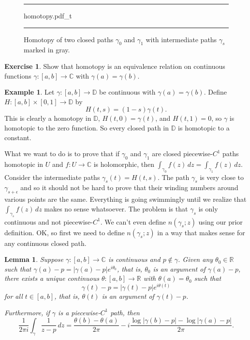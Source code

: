 \documentclass[12pt,openany]{book}
\newcommand{\sabs}[1]{\lvert {#1} \rvert}
\newcommand{\C}{{\mathbb{C}}}
\newcommand{\R}{{\mathbb{R}}}
\newcommand{\D}{{\mathbb{D}}}
\theoremstyle{plain}
\newtheorem{lemma}[thm]{Lemma}
\theoremstyle{remark}
\theoremstyle{definition}
\newenvironment{exbox}{%
    \def\FrameCommand{\vrule width 1pt \relax\hspace{10pt}}%
    \MakeFramed{\advance\hsize-\width\FrameRestore}%
}{%
    \endMakeFramed
}
\newenvironment{myfig}{%
\begin{figure}[h!t]
\noindent\rule{\textwidth}{0.5pt}\vspace{12pt}\par\centering}%
{\par\noindent\rule{\textwidth}{0.5pt}
\end{figure}}
\theoremstyle{exercise}
\newtheorem{exercise}{Exercise}[section]
\theoremstyle{example}
\newtheorem{example}[thm]{Example}
\begin{document}
\begin{myfig}
{homotopy.pdf_t}
\caption{Homotopy of two closed paths $\gamma_0$ and
$\gamma_1$ with intermediate paths $\gamma_s$ marked in gray.\label{fig:homotopy}}
\end{myfig}

\begin{exbox}
\begin{exercise}
Show that homotopy is an equivalence relation on continuous functions
$\gamma \colon [a,b] \to \C$ with $\gamma(a)=\gamma(b)$.
\end{exercise}
\end{exbox}

\begin{example} \label{example:homotopydiscsc}
Let $\gamma \colon [a,b] \to \D$ be continuous with $\gamma(a)=\gamma(b)$.  Define
$H \colon [a,b] \times [0,1] \to \D$ by
\begin{equation*}
H(t,s) = (1-s) \gamma(t) .
\end{equation*}
This is clearly a homotopy in $\D$, $H(t,0) = \gamma(t)$,
and $H(t,1) = 0$, so $\gamma$ is homotopic to the zero function.
So every closed path in $\D$ is homotopic to a constant.
\end{example}

What we want to do is to prove that if $\gamma_0$ and $\gamma_1$ are
closed
piecewise-$C^1$ paths homotopic in $U$ and $f \colon U \to \C$ is holomorphic, then
$\int_{\gamma_0} f(z)\,dz = \int_{\gamma_1} f(z)\, dz$.
Consider the intermediate paths $\gamma_s(t) = H(t,s)$.
The path $\gamma_s$ is very close to
$\gamma_{s+\epsilon}$ and so it should not be hard to prove that their
winding numbers around various points are the same.
Everything is going swimmingly until we realize that $\int_{\gamma_s} f(z)
\, dz$ makes no sense whatsoever.  The problem is that $\gamma_s$ is only
continuous and not piecewise-$C^1$.  We can't
even define $n(\gamma_s;z)$ using our prior definition.
OK\@, so first we need to define $n(\gamma_s;z)$ in a way that makes sense for
any continuous closed path.

\begin{lemma} \label{lemma:existenceoftheta}
Suppose $\gamma \colon [a,b] \to \C$ is continuous and $p \notin
\gamma$.  Given any $\theta_0 \in \R$ such that
$\gamma(a)-p = \sabs{\gamma(a)-p} e^{i\theta_0}$, that is,
$\theta_0$ is an argument of $\gamma(a)-p$,
there exists a unique continuous
$\theta \colon [a,b] \to \R$ with $\theta(a) = \theta_0$ such that
\begin{equation*}
\gamma(t)-p = \sabs{\gamma(t)-p} e^{i\theta(t)}
\end{equation*}
for all $t \in [a,b]$, that is, $\theta(t)$ is an argument of $\gamma(t)-p$.

Furthermore, if $\gamma$ is a piecewise-$C^1$ path, then
\begin{equation*}
\frac{1}{2\pi i} \int_\gamma \frac{1}{z-p} \, dz =
\frac{\theta(b)-\theta(a)}{2\pi} 
- i \frac{\log \sabs{\gamma(b)-p} - \log \sabs{\gamma(a)-p}}{2\pi} .
\end{equation*}
\end{lemma}
\end{document}
